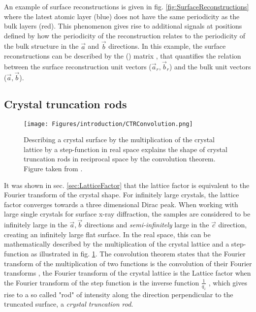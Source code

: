 An example of surface reconstructions is given in fig. \ref{fig:SurfaceReconstructions} where the latest atomic layer (blue) does not have the same periodicity as the bulk layers (red).
This phenomenon gives rise to additional signals at positions defined by how the periodicity of the reconstruction relates to the periodicity of the bulk structure in the $\vec{a}$ and $\vec{b}$ directions.
In this example, the surface reconstructions can be described by the () matrix \parencite{Wood1964}, that quantifies the relation between the surface reconstruction unit vectors ($\vec{a}_r, \vec{b}_r$) and the bulk unit vectors ($\vec{a}, \vec{b}$).

\subsection{Crystal truncation rods} \label{sec:CTR}

\begin{figure}[!htb]
    \centering
    \texttt{[image: Figures/introduction/CTRConvolution.png]}
    \caption{
    Describing a crystal surface by the multiplication of the crystal lattice by a step-function in real space explains the shape of crystal truncation rods in reciprocal space by the convolution theorem.
    Figure taken from \cite{Willmott}.
    }
    \label{fig:CTRConvolution}
\end{figure}

It was shown in sec. \ref{sec:LatticeFactor} that the lattice factor is equivalent to the Fourier transform of the crystal shape.
For infinitely large crystals, the lattice factor converges towards a three dimensional Dirac peak.
When working with large single crystals for surface x-ray diffraction, the samples are considered to be infinitely large in the $\vec{a}, \vec{b}$ directions and \textit{semi-infinitely} large in the $\vec{c}$ direction, creating an infinitely large flat surface.
In the real space, this can be mathematically described by the multiplication of the crystal lattice and a step-function as illustrated in fig. \ref{fig:CTRConvolution}.
The convolution theorem states that the Fourier transform of the multiplication of two functions is the convolution of their Fourier transforms \parencite{Mcalister2003}, the Fourier transform of the crystal lattice is the Lattice factor when the Fourier transform of the step function is the inverse function $\frac{1}{q_z}$ \parencite{Andrews1985, Robinson1986}, which gives rise to a so called "rod" of intensity along the direction perpendicular to the truncated surface, a \textit{crystal truncation rod}.

